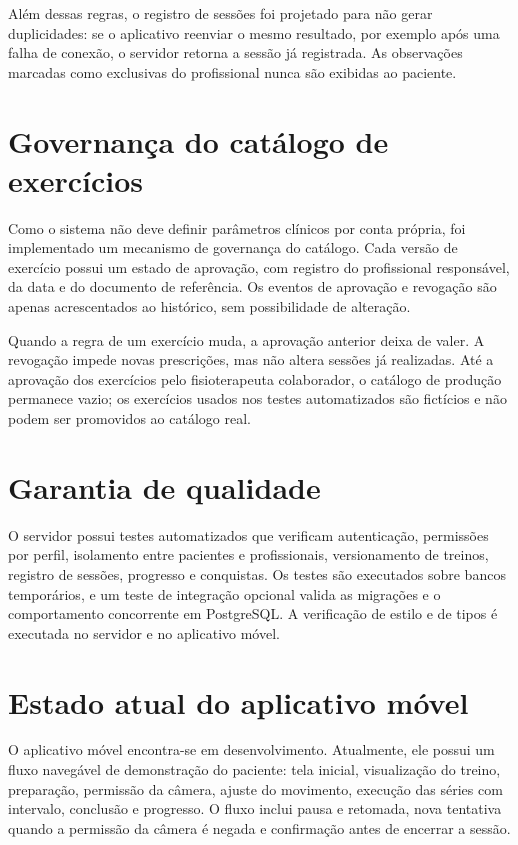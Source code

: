 Além dessas regras, o registro de sessões foi projetado para não gerar duplicidades: se o aplicativo reenviar o mesmo resultado, por exemplo após uma falha de conexão, o servidor retorna a sessão já registrada. As observações marcadas como exclusivas do profissional nunca são exibidas ao paciente.

\section{Governança do catálogo de exercícios}
\label{sec:governanca}

Como o sistema não deve definir parâmetros clínicos por conta própria, foi implementado um mecanismo de governança do catálogo. Cada versão de exercício possui um estado de aprovação, com registro do profissional responsável, da data e do documento de referência. Os eventos de aprovação e revogação são apenas acrescentados ao histórico, sem possibilidade de alteração.

Quando a regra de um exercício muda, a aprovação anterior deixa de valer. A revogação impede novas prescrições, mas não altera sessões já realizadas. Até a aprovação dos exercícios pelo fisioterapeuta colaborador, o catálogo de produção permanece vazio; os exercícios usados nos testes automatizados são fictícios e não podem ser promovidos ao catálogo real.

\section{Garantia de qualidade}
\label{sec:qualidade}

O servidor possui testes automatizados que verificam autenticação, permissões por perfil, isolamento entre pacientes e profissionais, versionamento de treinos, registro de sessões, progresso e conquistas. Os testes são executados sobre bancos temporários, e um teste de integração opcional valida as migrações e o comportamento concorrente em PostgreSQL. A verificação de estilo e de tipos é executada no servidor e no aplicativo móvel.

\section{Estado atual do aplicativo móvel}
\label{sec:estado-mobile}

O aplicativo móvel encontra-se em desenvolvimento. Atualmente, ele possui um fluxo navegável de demonstração do paciente: tela inicial, visualização do treino, preparação, permissão da câmera, ajuste do movimento, execução das séries com intervalo, conclusão e progresso. O fluxo inclui pausa e retomada, nova tentativa quando a permissão da câmera é negada e confirmação antes de encerrar a sessão.

